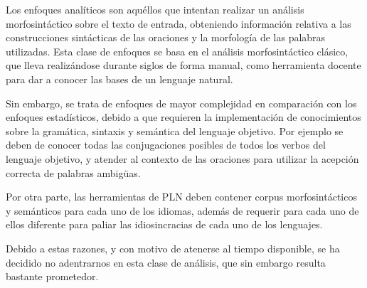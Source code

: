 \lhead{\emph{\ChapterTwo{}}}
Los enfoques analíticos son aquéllos que intentan realizar un análisis morfosintáctico sobre el texto de entrada, obteniendo información relativa a las construcciones sintácticas de las oraciones y la morfología de las palabras utilizadas.
%
Esta clase de enfoques se basa en el análisis morfosintáctico clásico, que lleva realizándose durante siglos de forma manual, como herramienta docente para dar a conocer las bases de un lenguaje natural.

Sin embargo, se trata de enfoques de mayor complejidad en comparación con los enfoques estadísticos, debido a que requieren la implementación de conocimientos sobre la gramática, sintaxis y semántica del lenguaje objetivo.
%
Por ejemplo se deben de conocer todas las conjugaciones posibles de todos los verbos del lenguaje objetivo, y atender al contexto de las oraciones para utilizar la acepción correcta de palabras ambigüas.

Por otra parte, las herramientas de PLN deben contener corpus morfosintácticos y semánticos para cada uno de los idiomas, además de requerir para cada uno de ellos diferente para paliar las idiosincracias de cada uno de los lenguajes.

Debido a estas razones, y con motivo de atenerse al tiempo disponible, se ha decidido no adentrarnos en esta clase de análisis, que sin embargo resulta bastante prometedor.